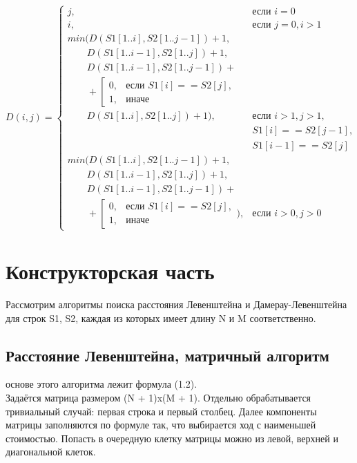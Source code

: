 \documentclass[12pt]{report}
\begin{document}
\begin{equation}
	D(i,j) = \left\{ \begin{array}{ll}
		j, & \textrm{$\mbox{если }i = 0$}\\
		i, & \textrm{$\mbox{если }j = 0, i > 1$}\\ %
		min(D(S1[1..i], S2[1.. j - 1]) + 1,\\
		\qquad D(S1[1..i - 1], S2[1..j]) + 1,\\
		\qquad D(S1[1..i - 1], S2[1..j - 1]) + \\
		\qquad+\left[ 
		\begin{array}{ccc}
			0, & \textrm{$\mbox{если }S1[i] == S2[j],$}\\
			1, & \textrm{иначе}
		\end{array} 
		\right.\\
		\qquad D(S1[1..i], S2[1..j]) + 1), & \textrm{$\mbox{если }i > 1, j > 1,$}\\
		& \textrm{$S1[i] == S2[j - 1],$}\\
		& \textrm{$S1[i - 1] == S2[j]$}\\
		min(D(S1[1..i], S2[1..j - 1]) + 1,\\
		\qquad D(S1[1..i - 1], S2[1..j]) + 1, \\
		\qquad D(S1[1..i - 1], S2[1..j - 1]) + \\
		\qquad+\left[ 
		\begin{array}{ccc}
			0, & \textrm{$\mbox{если }S1[i] == S2[j],$}\\
			1, & \textrm{иначе}
		\end{array} 
		\right.), &\textrm{$\mbox{если }i>0, j>0$}
	\end{array} \right.
\end{equation}

\chapter{Конструкторская часть}

Рассмотрим алгоритмы поиска расстояния Левенштейна и Дамерау-Левенштейна для строк S1, S2, каждая из которых имеет длину N и M соответственно.

\section{Расстояние Левенштейна, матричный алгоритм}
 основе этого алгоритма лежит формула (1.2). \\

Задаётся матрица размером (N + 1)x(M + 1). Отдельно обрабатывается тривиальный случай: первая строка и первый столбец. 
Далее компоненты матрицы заполняются по формуле так, что выбирается ход с наименьшей стоимостью. 
Попасть в очередную клетку матрицы можно из левой, верхней и диагональной клеток.\\
\end{document}
